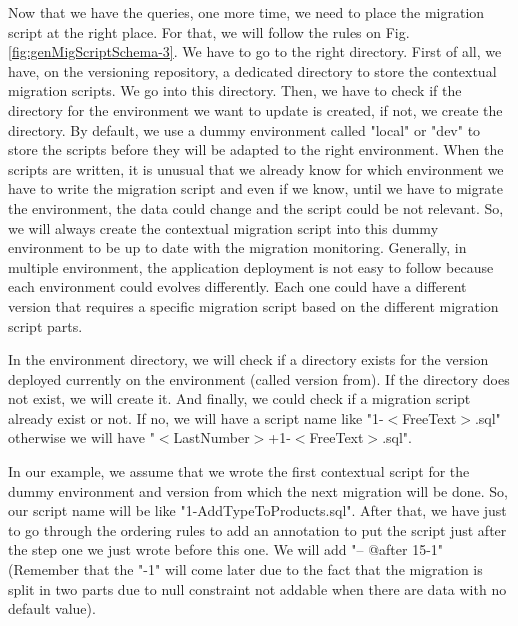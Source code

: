 Now that we have the queries, one more time, we need to place the migration script at the right place. For that, we will follow the rules on Fig. \ref{fig:genMigScriptSchema-3}. We have to go to the right directory. First of all, we have, on the versioning repository, a dedicated directory to store the contextual migration scripts. We go into this directory. Then, we have to check if the directory for the environment we want to update is created, if not, we create the directory. By default, we use a dummy environment called "local" or "dev" to store the scripts before they will be adapted to the right environment. When the scripts are written, it is unusual that we already know for which environment we have to write the migration script and even if we know, until we have to migrate the environment, the data could change and the script could be not relevant. So, we will always create the contextual migration script into this dummy environment to be up to date with the migration monitoring. Generally, in multiple environment, the application deployment is not easy to follow because each environment could evolves differently. Each one could have a different version that requires a specific migration script based on the different migration script parts.

In the environment directory, we will check if a directory exists for the version deployed currently on the environment (called version from). If the directory does not exist, we will create it. And finally, we could check if a migration script already exist or not. If no, we will have a script name like "1-$<$FreeText$>$.sql" otherwise we will have "$<$LastNumber$>$+1-$<$FreeText$>$.sql".

In our example, we assume that we wrote the first contextual script for the dummy environment and version from which the next migration will be done. So, our script name will be like "1-AddTypeToProducts.sql". After that, we have just to go through the ordering rules to add an annotation to put the script just after the step one we just wrote before this one. We will add "-- @after 15-1" (Remember that the "-1" will come later due to the fact that the migration is split in two parts due to null constraint not addable when there are data with no default value).

